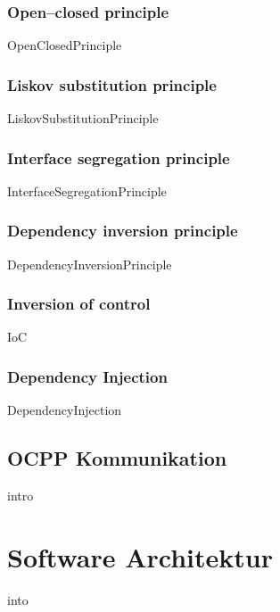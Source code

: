 \documentclass{article}
\begin{document}
        \subsubsection{Open–closed principle}
            {OpenClosedPrinciple}
        
        \subsubsection{Liskov substitution principle}
            {LiskovSubstitutionPrinciple}
        
        \subsubsection{Interface segregation principle}
        \label{kap:ISP}
            {InterfaceSegregationPrinciple}
                   
        \subsubsection{Dependency inversion principle}
            {DependencyInversionPrinciple}

        \subsubsection{Inversion of control}
        \label{kap:IoC}
            {IoC}

        \subsubsection{Dependency Injection}
        \label{DependencyInjection}
            {DependencyInjection}

    \subsection{OCPP Kommunikation}
        {intro}

\newpage

\section{Software Architektur}
    {into}
\end{document}
